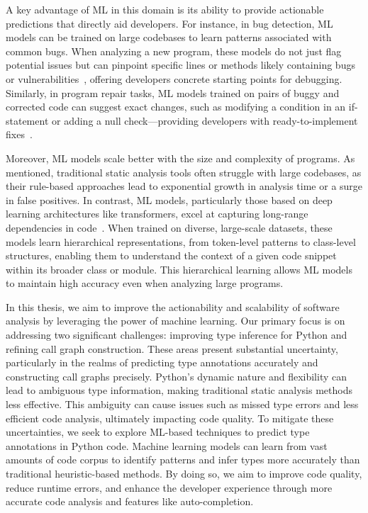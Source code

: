 A key advantage of ML in this domain is its ability to provide actionable predictions that directly aid developers. For instance, in bug detection, ML models can be trained on large codebases to learn patterns associated with common bugs. When analyzing a new program, these models do not just flag potential issues but can pinpoint specific lines or methods likely containing bugs or vulnerabilities~\cite {fu2022linevul}, offering developers concrete starting points for debugging. Similarly, in program repair tasks, ML models trained on pairs of buggy and corrected code can suggest exact changes, such as modifying a condition in an if-statement or adding a null check—providing developers with ready-to-implement fixes~\cite{zhang2023survey}.

Moreover, ML models scale better with the size and complexity of programs. As mentioned, traditional static analysis tools often struggle with large codebases, as their rule-based approaches lead to exponential growth in analysis time or a surge in false positives. In contrast, ML models, particularly those based on deep learning architectures like transformers, excel at capturing long-range dependencies in code~\cite{maunveiling}. When trained on diverse, large-scale datasets, these models learn hierarchical representations, from token-level patterns to class-level structures, enabling them to understand the context of a given code snippet within its broader class or module. This hierarchical learning allows ML models to maintain high accuracy even when analyzing large programs. 

In this thesis, we aim to improve the actionability and scalability of software analysis by leveraging the power of machine learning. Our primary focus is on addressing two significant challenges: improving type inference for Python and refining call graph construction. These areas present substantial uncertainty, particularly in the realms of predicting type annotations accurately and constructing call graphs precisely. Python's dynamic nature and flexibility can lead to ambiguous type information, making traditional static analysis methods less effective. This ambiguity can cause issues such as missed type errors and less efficient code analysis, ultimately impacting code quality. To mitigate these uncertainties, we seek to explore ML-based techniques to predict type annotations in Python code. Machine learning models can learn from vast amounts of code corpus to identify patterns and infer types more accurately than traditional heuristic-based methods. By doing so, we aim to improve code quality, reduce runtime errors, and enhance the developer experience through more accurate code analysis and features like auto-completion.

